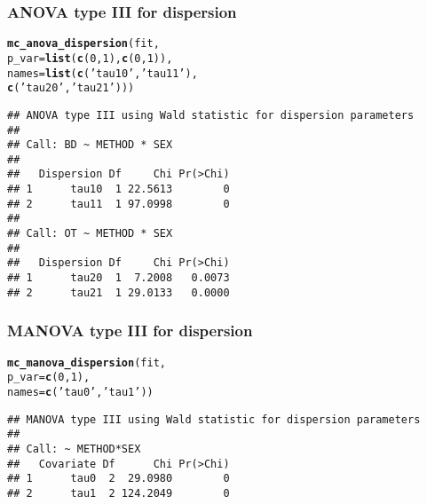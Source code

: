 \documentclass[article]{jss}\usepackage[]{graphicx}\usepackage[]{xcolor}
\makeatletter
\newcommand{\hlnum}[1]{\textcolor[rgb]{0.686,0.059,0.569}{#1}}%
\newcommand{\hlstr}[1]{\textcolor[rgb]{0.192,0.494,0.8}{#1}}%
\newcommand{\hlstd}[1]{\textcolor[rgb]{0.345,0.345,0.345}{#1}}%
\newcommand{\hlkwc}[1]{\textcolor[rgb]{0.333,0.667,0.333}{#1}}%
\newcommand{\hlkwd}[1]{\textcolor[rgb]{0.737,0.353,0.396}{\textbf{#1}}}%
\newenvironment{kframe}{%
 \def\at@end@of@kframe{}%
 \ifinner\ifhmode%
  \def\at@end@of@kframe{\end{minipage}}%
  \begin{minipage}{\columnwidth}%
 \fi\fi%
 \def\FrameCommand##1{\hskip\@totalleftmargin \hskip-\fboxsep
 \colorbox{shadecolor}{##1}\hskip-\fboxsep
     \hskip-\linewidth \hskip-\@totalleftmargin \hskip\columnwidth}%
 \MakeFramed {\advance\hsize-\width
   \@totalleftmargin\z@ \linewidth\hsize
   \@setminipage}}%
 {\par\unskip\endMakeFramed%
 \at@end@of@kframe}
\newenvironment{knitrout}{}{} %
\makeatother
\begin{document}
\subsubsection{ANOVA type III for dispersion}

\begin{knitrout}
\color{fgcolor}\begin{kframe}
\begin{alltt}
\hlkwd{mc_anova_dispersion}\hlstd{(fit,}
                    \hlkwc{p_var} \hlstd{=} \hlkwd{list}\hlstd{(}\hlkwd{c}\hlstd{(}\hlnum{0}\hlstd{,}\hlnum{1}\hlstd{),} \hlkwd{c}\hlstd{(}\hlnum{0}\hlstd{,}\hlnum{1}\hlstd{)),}
                    \hlkwc{names} \hlstd{=} \hlkwd{list}\hlstd{(}\hlkwd{c}\hlstd{(}\hlstr{'tau10'}\hlstd{,} \hlstr{'tau11'}\hlstd{),}
                                 \hlkwd{c}\hlstd{(}\hlstr{'tau20'}\hlstd{,} \hlstr{'tau21'}\hlstd{)))}
\end{alltt}
\begin{verbatim}
## ANOVA type III using Wald statistic for dispersion parameters
## 
## Call: BD ~ METHOD * SEX
## 
##   Dispersion Df     Chi Pr(>Chi)
## 1      tau10  1 22.5613        0
## 2      tau11  1 97.0998        0
## 
## Call: OT ~ METHOD * SEX
## 
##   Dispersion Df     Chi Pr(>Chi)
## 1      tau20  1  7.2008   0.0073
## 2      tau21  1 29.0133   0.0000
\end{verbatim}
\end{kframe}
\end{knitrout}

\subsubsection{MANOVA type III for dispersion}

\begin{knitrout}
\color{fgcolor}\begin{kframe}
\begin{alltt}
\hlkwd{mc_manova_dispersion}\hlstd{(fit,}
                     \hlkwc{p_var} \hlstd{=} \hlkwd{c}\hlstd{(}\hlnum{0}\hlstd{,}\hlnum{1}\hlstd{),}
                     \hlkwc{names} \hlstd{=} \hlkwd{c}\hlstd{(}\hlstr{'tau0'}\hlstd{,} \hlstr{'tau1'}\hlstd{))}
\end{alltt}
\begin{verbatim}
## MANOVA type III using Wald statistic for dispersion parameters
## 
## Call: ~ METHOD*SEX
##   Covariate Df      Chi Pr(>Chi)
## 1      tau0  2  29.0980        0
## 2      tau1  2 124.2049        0
\end{verbatim}
\end{kframe}
\end{knitrout}
\end{document}

